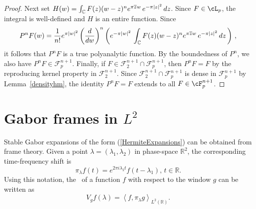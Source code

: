 \documentclass[12pt]{amsart}
\theoremstyle{plain}
\numberwithin{equation}{section}
\begin{document}
\begin{proof}
Next set $H(w) =\int_{%
\mathbb{C}
}F(z)(w-z)^{n}e^{\pi \overline{z}w}\,e^{-\pi |z|^{2}}\,dz$. Since $F\in \cL %
_p$, the integral is well-defined and $H$ is an entire function. Since 
\begin{equation*}
P^{n}F(w)=\frac{1}{n!}e^{\pi \left\vert w\right\vert ^{2}}\left( \frac{d}{dw}%
\right) ^{n}\left( e^{-\pi |w|^{2}}\,\int_{%
\mathbb{C}
}F(z)(w-z)^{n}e^{\pi \overline{z}w}\,e^{-\pi |z|^{2}}\,dz\,\right) \,,
\end{equation*}%
it follows that $P^{n}F$ is a true polyanalytic function. By the boundedness
of $P^n$, we also have $P^{n}F\in \mathcal{F}_{p}^{n+1}$. Finally, if $F \in 
\mathcal{F}_{2}^{n+1}\cap \mathcal{F}_{p}^{n+1}$, then $P^nF = F$ by the
reproducing kernel property in $\mathcal{F}_{2}^{n+1}$. Since $\mathcal{F}%
_{2}^{n+1}\cap \mathcal{F}_{p}^{n+1}$ is dense in $\mathcal{F}_{p}^{n+1}$ by
Lemma~\ref{densityhm}, the identity $P^nF = F$ extends to all $F\in \cF %
^{n+1}_p$.
\end{proof}

\section{Gabor frames in $L^{2}$}

Stable Gabor expansions of the form (\ref{HermiteExpansions}) can be
obtained from frame theory. Given a point $\lambda =(\lambda _1,\lambda _2 )$
in phase-space $%
\mathbb{R}
^{2}$, the corresponding time-frequency shift is%
\begin{equation*}
\pi _{\lambda }f(t)=e^{2\pi i\lambda _2 t}f(t-\lambda _1)\text{, \ \ \ }t\in 
\mathbb{R}
\text{.}
\end{equation*}%
Using this notation, the \stft\ of a function $f$ with respect to the window 
$g$ can be written as%
\begin{equation*}
V_{g}f(\lambda )=\left\langle f,\pi _{\lambda }g\right\rangle _{L^{2}(%
\mathbb{R}
)}\text{.}
\end{equation*}
\end{document}
